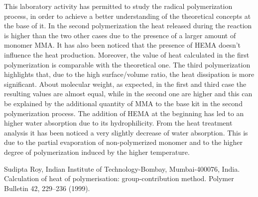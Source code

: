 \documentclass[a4paper, 11pt]{article}
\begin{document}
This laboratory activity has permitted to study the radical polymerization process, in order to achieve a better understanding of the theoretical concepts at the base of it.
In the second polymerization the heat released during the reaction is higher than the two other cases due to the presence of a larger amount of monomer MMA. It has also been noticed that the presence of HEMA doesn't influence the heat production. Moreover, the value of heat calculated in the first polymerization is comparable with the theoretical one. The third polymerization highlights that, due to the high surface/volume ratio, the heat dissipation is more significant. About molecular weight, as expected, in the first and third case the resulting values are almost equal, while in the second one are higher and this can be explained by the additional quantity of MMA to the base kit in the second polymerization process. The addition of HEMA at the beginning has led to an higher water absorption due to its hydrophilicity. From the heat treatment analysis it has been noticed a very slightly decrease of water absorption. This is due to the partial evaporation of non-polymerized monomer and to the higher degree of polymerization induced by the higher temperature.

\newpage

\thispagestyle{empty}

\begin{thebibliography}{11}

 Sudipta Roy, Indian Institute of Technology-Bombay, Mumbai-400076, India. Calculation of heat of polymerisation: group-contribution method. Polymer Bulletin 42, 229–236 (1999).

\end{thebibliography}

\newpage
\end{document}
